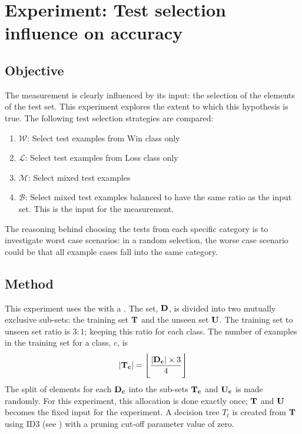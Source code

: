 
\section{Experiment: Test selection influence on accuracy} %
\label{sec:c4-025}
\subsection{Objective}
The  measurement is clearly influenced by its input: the selection of the elements of the test set.  This experiment explores the extent to which this hypothesis is true.
The following test selection strategies are compared:
\begin{enumerate}
	\item $\mathcal W$: Select test examples from Win class only
	\item $\mathcal L$: Select test examples from Loss class only
	\item $\mathcal M$: Select mixed test examples
	\item $\mathcal B$: Select mixed test examples balanced to have the same ratio as the input set.  This is the input for the  measurement. %
\end{enumerate} 
The reasoning behind choosing the tests from each specific category is to investigate worst case scenarios: in a random selection, the worse case scenario could be that all example cases fall into the same category. 

\subsection{Method}
This experiment uses the  with a . The set, $\myset D$, is divided into two mutually exclusive sub-sets: the training set $\myset T$ and the unseen set $\myset U$. The training set to unseen set ratio is $3:1$; keeping this ratio for each class. The number of examples in the training set for a class, $c$, is \[ |\myset{T_c}| = \floor[\Bigg]{\frac{|\myset{D_c}| \times 3} {4}}\] 
The split of elements for each $\myset{D_c}$ into the sub-sets $\myset{T_c}$ and $\myset{U_c}$ is made randomly. For this experiment, this allocation is done exactly once; $\myset T$ and $\myset U$ becomes the fixed input for the experiment. A decision tree $T_t$ is created from $\myset T$ using ID3 (see ) with a pruning cut-off parameter value of zero.   

